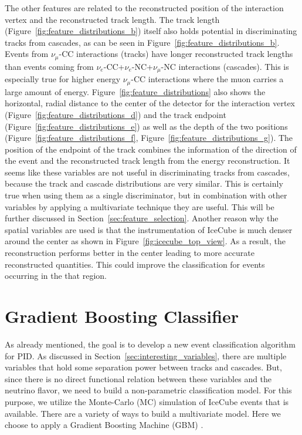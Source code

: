 The other features are related to the reconstructed position of the interaction vertex and the reconstructed track length.
The track length (Figure~\ref{fig:feature_distributions_b}) itself also holds potential in discriminating tracks from cascades, as can be seen in Figure~\ref{fig:feature_distributions_b}.
Events from $\nu_\mu$-CC interactions (tracks) have longer reconstructed track lengths than events coming from $\nu_e$-CC+$\nu_e$-NC+$\nu_\mu$-NC interactions (cascades).
This is especially true for higher energy $\nu_\mu$-CC interactions where the muon carries a large amount of energy.
Figure~\ref{fig:feature_distributions} also shows the horizontal, radial distance to the center of the detector for the interaction vertex (Figure~\ref{fig:feature_distributions_d}) and the track endpoint (Figure~\ref{fig:feature_distributions_e}) as well as the depth of the two positions (Figure~\ref{fig:feature_distributions_f}, Figure~\ref{fig:feature_distributions_g}).
The position of the endpoint of the track combines the information of the direction of the event and the reconstructed track length from the energy reconstruction.
It seems like these variables are not useful in discriminating tracks from cascades, because the track and cascade distributions are very similar.
This is certainly true when using them as a single discriminator, but in combination with other variables by applying a multivariate technique they are useful.
This will be further discussed in Section~\ref{sec:feature_selection}.
Another reason why the spatial variables are used is that the instrumentation of IceCube is much denser around the center as shown in Figure~\ref{fig:icecube_top_view}.
As a result, the reconstruction performs better in the center leading to more accurate reconstructed quantities.
This could improve the classification for events occurring in the that region.


\section{Gradient Boosting Classifier} \label{sec:gradient_boosting_classifier}

As already mentioned, the goal is to develop a new event classification algorithm for PID.
As discussed in Section~\ref{sec:interesting_variables}, there are multiple variables that hold some separation power between tracks and cascades.
But, since there is no direct functional relation between these variables and the neutrino flavor, we need to build a non-parametric classification model.
For this purpose, we utilize the Monte-Carlo (MC) simulation of IceCube events that is available.
There are a variety of ways to build a multivariate model.
Here we choose to apply a Gradient Boosting Machine (GBM) \cite{friedman2001}.

